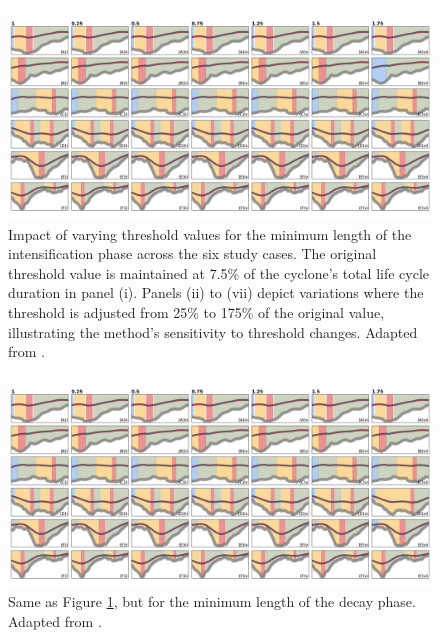 \begin{figure}[h!]
    \centering
    \includegraphics[width=\textwidth]{figs_3/figure_threshold_intensification_length.png}
    \caption[Impact of Varying Threshold Values for Intensification Phase]{Impact of varying threshold values for the minimum length of the intensification phase across the six study cases. The original threshold value is maintained at 7.5\% of the cyclone's total life cycle duration in panel (i). Panels (ii) to (vii) depict variations where the threshold is adjusted from 25\% to 175\% of the original value, illustrating the method's sensitivity to threshold changes. Adapted from \citet{deSouza2024}.}
    \label{fig:threshold_intensification}
\end{figure}

\begin{figure}[h!]
    \centering
    \includegraphics[width=\textwidth]{figs_3/figure_threshold_decay_length.png}
    \caption[Impact of Varying Threshold Values for Decay Phase]{Same as Figure \ref{fig:threshold_intensification}, but for the minimum length of the decay phase. Adapted from \citet{deSouza2024}.}
    \label{fig:threshold_decay}
\end{figure}


